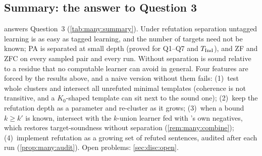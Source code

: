 \subsection{Summary: the answer to Question 3}\label{sec:many:summary}

\DTRC{} answers Question~3 (\cref{tab:many:summary}). Under refutation separation untagged learning is as easy as
tagged learning, and the number of targets need not be known; PA is separated at small depth (proved for Q1--Q7 and
$T_{\mathrm{Ind}}$), and ZF and ZFC on every sampled pair and every run. Without separation \DTRC{} is sound relative to a residue
that no computable learner can avoid in general. Four features are forced by the results above, and a naive version
without them fails: (1)~test whole clusters and intersect all unrefuted minimal templates (coherence is not
transitive, and a $K_0$-shaped template can sit next to the sound one); (2)~keep the refutation depth as a parameter and
re-cluster as it grows; (3)~when a bound $k\ge k'$ is known, intersect with the $k$-union learner fed with \DTRC's own
negatives, which restores target-soundness without separation (\cref{rem:many:combine}); (4)~implement refutation as a growing set of refuted sentences, audited after each run
(\cref{prop:many:audit}). Open problems: \cref{sec:disc:open}.

